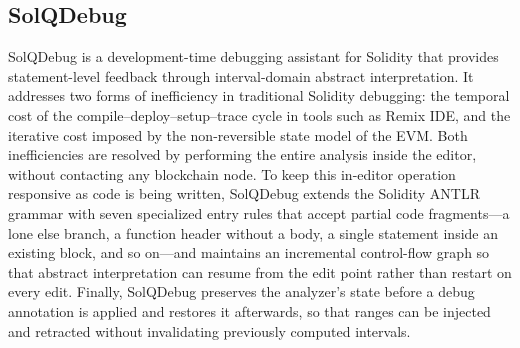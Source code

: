 \documentclass[pdflatex,sn-basic]{sn-jnl}%
\theoremstyle{thmstyleone}%
\theoremstyle{thmstyletwo}%
\theoremstyle{thmstylethree}%
\begin{document}
\subsection{SolQDebug}\label{sec:prelim:foundations}

SolQDebug is a development-time debugging assistant for Solidity that provides statement-level feedback through interval-domain abstract interpretation.
It addresses two forms of inefficiency in traditional Solidity debugging: the temporal cost of the compile--deploy--setup--trace cycle in tools such as Remix IDE, and the iterative cost imposed by the non-reversible state model of the EVM.
Both inefficiencies are resolved by performing the entire analysis inside the editor, without contacting any blockchain node.
To keep this in-editor operation responsive as code is being written, SolQDebug extends the Solidity ANTLR grammar with seven specialized entry rules that accept partial code fragments---a lone else branch, a function header without a body, a single statement inside an existing block, and so on---and maintains an incremental control-flow graph so that abstract interpretation can resume from the edit point rather than restart on every edit.
Finally, SolQDebug preserves the analyzer's state before a debug annotation is applied and restores it afterwards, so that ranges can be injected and retracted without invalidating previously computed intervals.
\end{document}
